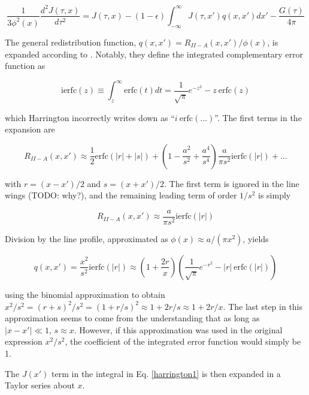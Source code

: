 \documentclass[onecolumn]{aastex63}
\begin{document}
\begin{equation} \label{harrington1}
    \frac{1}{3\phi^2(x)}\frac{d^2J(\tau, x)}{d\tau^2} = J(\tau, x) - (1-\epsilon)\int_{-\infty}^{\infty}J(\tau, x')q(x, x')dx' - \frac{G(\tau)}{4\pi}
\end{equation}

The general redistribution function, $q(x, x') = R_{II-A}(x, x')/\phi (x)$, is expanded according to \cite{1971JQSRT..11.1365A}. Notably, they define the integrated complementary error function as 

\begin{equation}
    \mathrm{ierfc}(z) \equiv \int_z^{\infty} \mathrm{erfc}(t) dt = \frac{1}{\sqrt{\pi}} e^{-z^2} - z\  \mathrm{erfc}(z)
\end{equation}

which Harrington incorrectly writes down as ``$i\ \mathrm{erfc(...)}$''. The first terms in the expansion are 


\begin{equation}
    R_{II-A}(x, x') \approx \frac{1}{2}\mathrm{erfc}(|r|+|s|) + \left(1 - \frac{a^2}{s^2} + \frac{a^4}{s^4}\right) \frac{a}{\pi s^2} \mathrm{ierfc}(|r|) + ...
\end{equation}

with $r=(x-x')/2$ and $s=(x+x')/2$. The first term is ignored in the line wings (TODO: why?), and the remaining leading term of order $1/s^2$ is simply

\begin{equation}
    R_{II-A}(x, x') \approx \frac{a}{\pi s^2}\mathrm{ierfc}(|r|)
\end{equation}

Division by the line profile, approximated as $\phi(x) \approx a/(\pi x^2)$, yields

\begin{equation}
    q(x, x') = \frac{x^2}{s^2} \mathrm{ierfc}(|r|) \approx \left(1+\frac{2r}{x}\right)\left(\frac{1}{\sqrt{\pi}}e^{-r^2} - |r|\ \mathrm{erfc}(|r|)\right)
\end{equation}

using the binomial approximation to obtain $x^2/s^2 = (r+s)^2/s^2 = (1+r/s)^2 \approx 1 + 2r/s \approx 1 + 2r/x$. The last step in this approximation seems to come from the understanding that as long as $|x-x'|\ll 1$, $s \approx x$. However, if this approximation was used in the original expression $x^2/s^2$, the coefficient of the integrated error function would simply be 1.

The $J(x')$ term in the integral in Eq. \ref{harrington1} is then expanded in a Taylor series about $x$.
\end{document}

